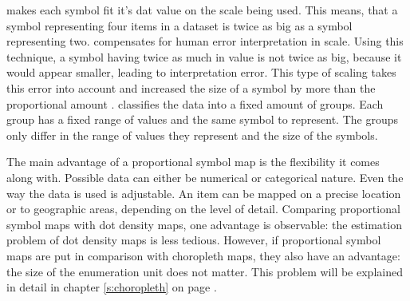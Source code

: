 \begin{enumerate}
 makes each symbol fit it's dat value on the scale being used. This means, that a symbol representing four items in a dataset is twice as big as a symbol representing two.
 compensates for human error interpretation in scale. Using this technique, a symbol having twice as much in value is not twice as big, because it would appear smaller, leading to interpretation error. This type of scaling takes this error into account and increased the size of a symbol by more than the proportional amount .
 classifies the data into a fixed amount of groups. Each group has a fixed range of values and the same symbol to represent. The groups only differ in the range of values they represent and the size of the symbols.
\end{enumerate}

The main advantage of a proportional symbol map is the flexibility it comes along with. Possible data can either be numerical or categorical nature. Even the way the data is used is adjustable. An item can be mapped on a precise location or to geographic areas, depending on the level of detail.
Comparing proportional symbol maps with dot density maps, one advantage is observable: the estimation problem of dot density maps is less tedious. However, if proportional symbol maps are put in comparison with choropleth maps, they also have an advantage: the size of the enumeration unit does not matter. This problem will be explained in detail in chapter \ref{s:choropleth} on page \pageref{s:choropleth}.